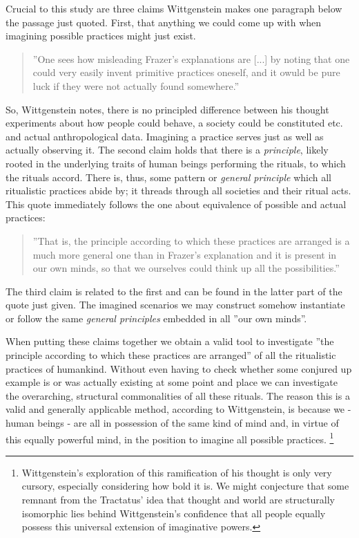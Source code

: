 \documentclass{article}
\begin{document}
Crucial to this study are three claims Wittgenstein makes one paragraph below the passage just quoted. First, that anything we could come up with when imagining possible practices might just exist.
\begin{quote}
''One sees how misleading Frazer's explanations are [...] by noting that one could very easily invent primitive practices oneself, and it owuld be pure luck if they were not actually found somewhere.''
\end{quote}
So, Wittgenstein notes, there is no principled difference between his thought experiments about how people could behave, a society could be constituted etc. and actual anthropological data. Imagining a practice serves just as well as actually observing it.
The second claim holds that there is a \textit{principle}, likely rooted in the underlying traits of human beings performing the rituals, to which the rituals accord. There is, thus, some pattern or \textit{general principle} which all ritualistic practices abide by; it threads through all societies and their ritual acts. This quote immediately follows the one about equivalence of possible and actual practices:
\begin{quote}
''That is, the principle according to which these practices are arranged is a much more general one than in Frazer's explanation and it is present in our own minds, so that we ourselves could think up all the possibilities.''
\end{quote}
The third claim is related to the first and can be found in the latter part of the quote just given. The imagined scenarios we may construct somehow instantiate or follow the same \textit{general principles} embedded in all ''our own minds''.

When putting these claims together we obtain a valid tool to investigate ''the principle according to which these practices are arranged'' of all the ritualistic practices of humankind. Without even having to check whether some conjured up example is or was actually existing at some point and place we can investigate the overarching, structural commonalities of all these rituals. The reason this is a valid and generally applicable method, according to Wittgenstein, is because we - human beings - are all in possession of the same kind of mind and, in virtue of this equally powerful mind, in the position to imagine all possible practices.
\footnote{Wittgenstein's exploration of this ramification of his thought is only very cursory, especially considering how bold it is. We might conjecture that some remnant from the Tractatus' idea that thought and world are structurally isomorphic lies behind Wittgenstein's confidence that all people equally possess this universal extension of imaginative powers.}
\end{document}
